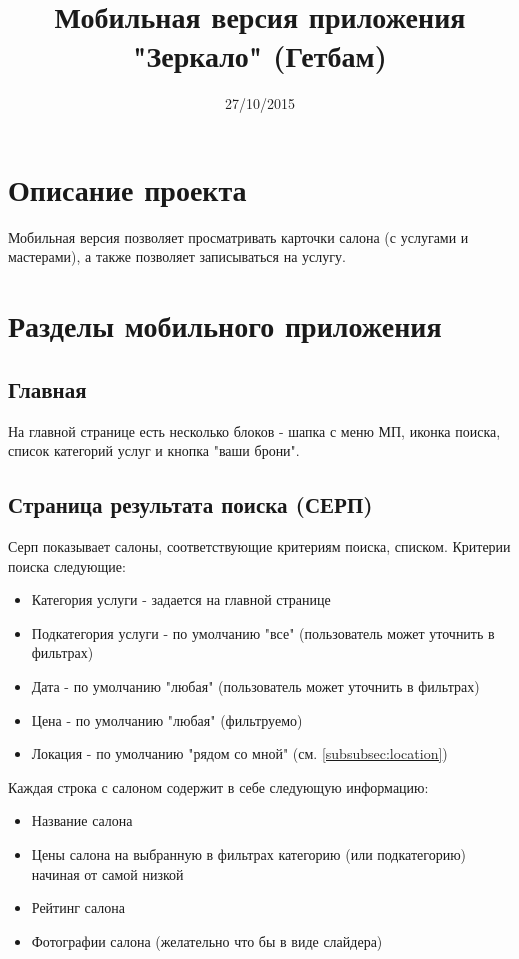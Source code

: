 \documentclass[DIV=calc, paper=a4, fontsize=11pt]{scrartcl} %
\title{Мобильная версия приложения "Зеркало" (Гетбам)}
\date{27/10/2015}
\begin{document}
\maketitle

\section{Описание проекта}
Мобильная версия позволяет просматривать карточки салона (с услугами и мастерами), а также позволяет записываться на услугу.

\section{Разделы мобильного приложения}

\subsection{Главная}
На главной странице есть несколько блоков - шапка с меню МП, иконка поиска, список категорий услуг и кнопка "ваши брони".


\subsection{Страница результата поиска (СЕРП)}
Серп показывает салоны, соответствующие критериям поиска, списком. Критерии поиска следующие:

\begin{itemize}
	\item Категория услуги - задается на главной странице
	\item Подкатегория услуги - по умолчанию "все" (пользователь может уточнить в фильтрах)
	\item Дата - по умолчанию "любая" (пользователь может уточнить в фильтрах)
	\item Цена - по умолчанию "любая" (фильтруемо)
	\item Локация - по умолчанию "рядом со мной" (см. \ref{subsubsec:location})
\end{itemize}

Каждая строка с салоном содержит в себе следующую информацию:

\begin{itemize}
	\item Название салона
	\item Цены салона на выбранную в фильтрах категорию (или подкатегорию) начиная от самой низкой
	\item Рейтинг салона
	\item Фотографии салона (желательно что бы в виде слайдера)
\end{itemize}
\end{document}
